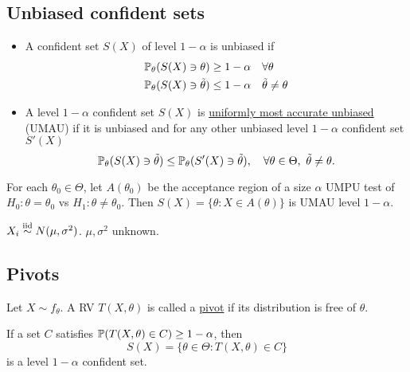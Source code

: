 \subsection{Unbiased confident sets}
\begin{mydef}\textbf{ }
	\begin{itemize}
		\item A confident set $S(X)$ of level $1-\alpha$ is unbiased if 
		\begin{align*}
		\mathbb{P}_\theta(S(X) \ni \theta) &\geq 1 -\alpha \quad \forall \theta \\
		\mathbb{P}_\theta(S(X) \ni \tilde{\theta}) &\leq 1 -\alpha \quad \tilde{\theta} \neq \theta 
		\end{align*}
		
		\item A level $1-\alpha$ confident set $S(X)$ is \uline{uniformly most accurate unbiased} (UMAU) if it is unbiased and for any other unbiased level $1-\alpha$ confident set $S'(X)$
		$$\PP_\theta (S(X) \ni \tilde{\theta}) \leq \PP_\theta(S'(X) \ni \tilde{\theta}),\quad \forall \theta\in \Theta,\ \tilde{\theta} \neq \theta.$$
	\end{itemize}
\end{mydef}

\begin{thm}
	For each $\theta_0 \in \Theta$, let $A(\theta_0)$ be the acceptance region of a size $\alpha$ UMPU test of $H_0:\theta=\theta_0$ vs $H_1: \theta \neq \theta_0$. Then $S(X) = \{ \theta: X\in A(\theta) \}$ is UMAU level $1-\alpha$. 
\end{thm}

\begin{exap}
	$X_i \stackrel{\text{iid}}{\sim} N(\mu,\sigma^2)$. $\mu,\sigma^2$ unknown.
\end{exap}

\subsection{Pivots}
\begin{mydef}
	Let $X \sim f_\theta$. A RV $T(X, \theta)$ is called a \uline{pivot} if its distribution is free of $\theta$. 
\end{mydef}

\begin{thm}
	If a set $C$ satisfies $\mathbb{P}(T(X,\theta) \in C)\geq 1-\alpha$, then 
	$$S(X) = \{ \theta \in \Theta: T(X,\theta) \in C \}$$
	is a level $1-\alpha$ confident set.
\end{thm}
  
